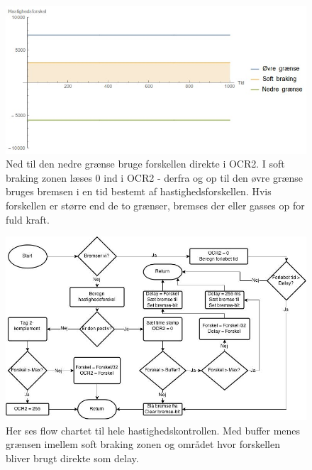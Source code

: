 \begin{figure}[h]

	\centering
		\includegraphics[scale=0.4]{Billeder/Braking.jpg}
	\caption{Ned til den nedre grænse bruge forskellen direkte i OCR2. I soft braking zonen læses 0 ind i OCR2 - derfra og op til den øvre grænse bruges bremsen i en tid bestemt af hastighedsforskellen. Hvis forskellen er større end de to grænser, bremses der eller gasses op for fuld kraft.}
	\label{fig:Forgiveness}
\end{figure}

\begin{figure}[hpt]

	\centering
		\includegraphics[scale=0.4]{Billeder/Speed.jpg}
	\caption{Her ses flow chartet til hele hastighedskontrollen. Med buffer menes grænsen imellem soft braking zonen og området hvor forskellen bliver brugt direkte som delay.}
	\label{fig:Speed}
	
\end{figure}


